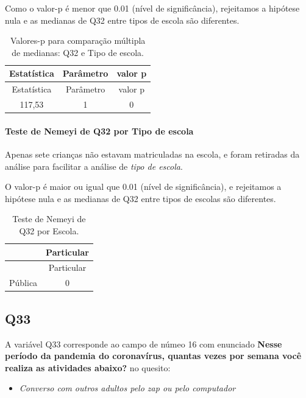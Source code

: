 \documentclass[]{article}
\providecommand{\tightlist}{%
  \setlength{\itemsep}{0pt}\setlength{\parskip}{0pt}}
\let\oldparagraph\paragraph
\renewcommand{\paragraph}[1]{\oldparagraph{#1}\mbox{}}
\begin{document}
Como o valor-p é menor que 0.01 (nível de significância), rejeitamos a hipótese nula e as medianas de Q32 entre tipos de escola são diferentes.

\begin{longtable}[]{@{}ccc@{}}
\caption{\label{tab:unnamed-chunk-1122}Valores-p para comparação múltipla de medianas: Q32 e Tipo de escola.}\tabularnewline
\toprule
Estatística & Parâmetro & valor p\tabularnewline
\midrule
\endfirsthead
\toprule
Estatística & Parâmetro & valor p\tabularnewline
\midrule
\endhead
117,53 & 1 & 0\tabularnewline
\bottomrule
\end{longtable}

\hypertarget{teste-de-nemeyi-de-q32-por-tipo-de-escola}{%
\paragraph{Teste de Nemeyi de Q32 por Tipo de escola}\label{teste-de-nemeyi-de-q32-por-tipo-de-escola}}

Apenas sete crianças não estavam matriculadas na escola, e foram retiradas da análise para facilitar a análise de \emph{tipo de escola}.

O valor-p é maior ou igual que 0.01 (nível de significância), e rejeitamos a hipótese nula e as medianas de Q32 entre tipos de escolas são diferentes.

\begin{longtable}[]{@{}lc@{}}
\caption{\label{tab:unnamed-chunk-1124}Teste de Nemeyi de Q32 por Escola.}\tabularnewline
\toprule
& Particular\tabularnewline
\midrule
\endfirsthead
\toprule
& Particular\tabularnewline
\midrule
\endhead
Pública & 0\tabularnewline
\bottomrule
\end{longtable}

\cleardoublepage

\hypertarget{q33}{%
\subsection{Q33}\label{q33}}

A variável Q33 corresponde ao campo de númeo 16 com enunciado \textbf{Nesse período da pandemia do coronavírus, quantas vezes por semana você realiza as atividades abaixo?} no quesito:

\begin{itemize}
\tightlist
\item
  \emph{Converso com outros adultos pelo zap ou pelo computador}
\end{itemize}
\end{document}
